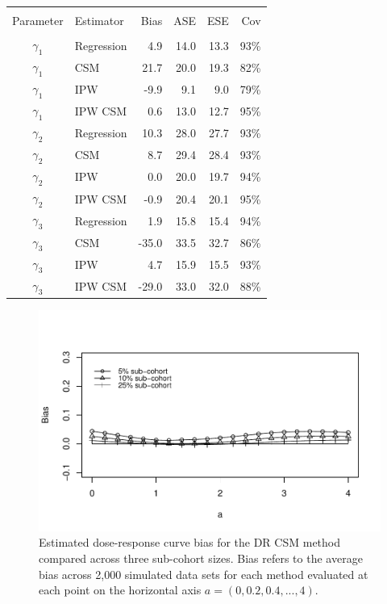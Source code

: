 \documentclass[12pt]{article}
\newcounter{tblcap}
\def\tblhead#1{\hline\\[-9pt]#1\\\hline\\[-9.75pt]}
\def\lastline{\\\hline}
\begin{document}
\begin{table}[h]
{\tabcolsep=4.25pt
\begin{tabular}{@{}clrrrr@{}}
       \tblhead{Parameter & Estimator & Bias & ASE & ESE & Cov}
$\gamma_{1}$ & Regression & 4.9 & 14.0 & 13.3 & 93\% \\
$\gamma_{1}$ & CSM & 21.7 & 20.0 & 19.3 & 82\% \\
$\gamma_{1}$ & IPW & -9.9 & 9.1 & 9.0 & 79\% \\
$\gamma_{1}$ & IPW CSM & 0.6 & 13.0 & 12.7 & 95\% \\[4pt]
$\gamma_{2}$ & Regression & 10.3 & 28.0 & 27.7 & 93\% \\
$\gamma_{2}$ & CSM & 8.7 & 29.4 & 28.4 & 93\% \\
$\gamma_{2}$ & IPW & 0.0 & 20.0 & 19.7 & 94\% \\
$\gamma_{2}$ & IPW CSM & -0.9 & 20.4 & 20.1 & 95\% \\[4pt]
$\gamma_{3}$ & Regression & 1.9 & 15.8 & 15.4 & 94\% \\
$\gamma_{3}$ & CSM & -35.0 & 33.5 & 32.7 & 86\% \\
$\gamma_{3}$ & IPW & 4.7 & 15.9 & 15.5 & 93\% \\
$\gamma_{3}$ & IPW CSM & -29.0 & 33.0 & 32.0 & 88\%
         \lastline
    \end{tabular}}
\end{table}

\newpage

\begin{figure}
\centering
\includegraphics[width=6in]{app_fig1.pdf}
\caption{Estimated dose-response curve bias for the DR CSM method compared across three sub-cohort sizes. Bias refers to the average bias across 2,000 simulated data sets for each method evaluated at each point on the horizontal axis $a = (0, 0.2, 0.4, ..., 4)$.}
\end{figure}
\end{document}
